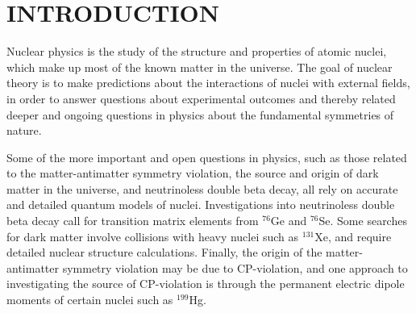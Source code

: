 \chapter{INTRODUCTION}
\label{chap:intro}


Nuclear physics is the study of the structure and properties of atomic nuclei, 
which make up most of the known matter in the universe.
The goal of nuclear theory is to make predictions about the interactions
of nuclei with external fields, in order to answer questions 
about experimental outcomes and thereby related deeper and ongoing questions in physics
about the fundamental symmetries of nature.

Some of the more important and open questions in physics, such as those related to 
the matter-antimatter symmetry violation, the source and origin of dark matter 
in the universe, and neutrinoless double beta decay, all rely on accurate and 
detailed quantum models of nuclei. 
Investigations 
into neutrinoless double beta decay call for transition matrix elements from 
$^{76}$Ge and $^{76}$Se\cite{Faessler,Brown2}. 
Some searches for dark matter involve collisions
with heavy nuclei such as $^{131}$Xe, and require detailed nuclear structure calculations\cite{Bednyakov}.
Finally, the origin of the matter-antimatter symmetry 
violation may be due to CP-violation\cite{Sakhorav}, and one approach to investigating the 
source of CP-violation is through the permanent electric dipole moments of certain
nuclei such as $^{199}$Hg\cite{Willmann}. 

